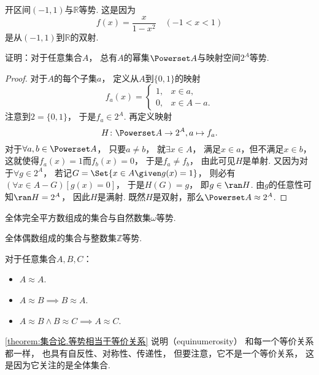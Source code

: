 \begin{example}\label{example:基数.开区间与全体实数等势2}
开区间\((-1,1)\)与\(\mathbb{R}\)等势.
这是因为\[
	f(x) = \frac{x}{1-x^2}
	\quad(-1<x<1)
\]是从\((-1,1)\)到\(\mathbb{R}\)的双射.
\end{example}

\begin{example}\label{example:基数.幂集与特征函数空间等势}
证明：对于任意集合\(A\)，
总有\(A\)的幂集\(\Powerset A\)与映射空间\(2^A\)等势.
\begin{proof}
对于\(A\)的每个子集\(a\)，
定义从\(A\)到\(\{0,1\}\)的映射\[
	f_a(x) = \left\{ \begin{array}{cl}
		1, & x \in a, \\
		0, & x \in A - a.
	\end{array} \right.
\]
注意到\(2=\{0,1\}\)，
于是\(f_a \in 2^A\).
再定义映射\[
	H\colon \Powerset A \to 2^A,
	a \mapsto f_a.
\]
对于\(\forall a,b \in \Powerset A\)，
只要\(a \neq b\)，
就\(\exists x \in A\)，
满足\(x \in a\)，但不满足\(x \in b\)，
这就使得\(f_a(x) = 1\)而\(f_b(x) = 0\)，
于是\(f_a \neq f_b\)，
由此可见\(H\)是单射.
又因为对于\(\forall g \in 2^A\)，
若记\(G = \Set{ x \in A \given g(x) = 1 }\)，
则必有\((\forall x \in A - G)[g(x) = 0]\)，
于是\(H(G) = g\)，
即\(g \in \ran H\).
由\(g\)的任意性可知\(\ran H = 2^A\)，
因此\(H\)是满射.
既然\(H\)是双射，那么\(\Powerset A \approx 2^A\).
\end{proof}
\end{example}

\begin{example}
全体完全平方数组成的集合与自然数集\(\omega\)等势.
\end{example}

\begin{example}
全体偶数组成的集合与整数集\(\mathbb{Z}\)等势.
\end{example}

\begin{theorem}\label{theorem:集合论.等势相当于等价关系}
对于任意集合\(A,B,C\)：\begin{itemize}
	\item \(A \approx A\).
	\item \(A \approx B \implies B \approx A\).
	\item \(A \approx B \land B \approx C \implies A \approx C\).
\end{itemize}
\end{theorem}
\cref{theorem:集合论.等势相当于等价关系}
说明（equinumerosity）
和每一个等价关系都一样，
也具有自反性、对称性、传递性，
但要注意，它不是一个等价关系，
这是因为它关注的是全体集合.

